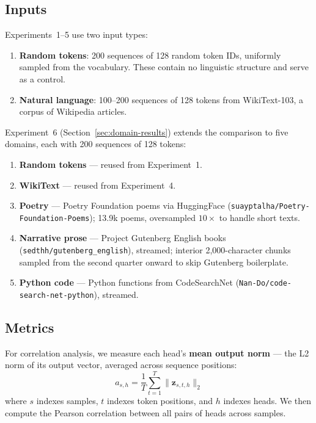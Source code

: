 \documentclass[11pt,a4paper]{article}
\begin{document}
\subsection{Inputs}

Experiments~1--5 use two input types:
\begin{enumerate}[itemsep=2pt]
    \item \textbf{Random tokens}: 200 sequences of 128 random token IDs, uniformly sampled from the vocabulary. These contain no linguistic structure and serve as a control.
    \item \textbf{Natural language}: 100--200 sequences of 128 tokens from WikiText-103, a corpus of Wikipedia articles.
\end{enumerate}

Experiment~6 (Section~\ref{sec:domain-results}) extends the comparison to five domains, each with 200 sequences of 128 tokens:

\begin{enumerate}[itemsep=2pt]
    \item \textbf{Random tokens} --- reused from Experiment~1.
    \item \textbf{WikiText} --- reused from Experiment~4.
    \item \textbf{Poetry} --- Poetry Foundation poems via HuggingFace (\texttt{suayptalha/Poetry-Foundation-Poems}); 13.9k poems, oversampled $10\times$ to handle short texts.
    \item \textbf{Narrative prose} --- Project Gutenberg English books (\texttt{sedthh/gutenberg\_english}), streamed; interior 2{,}000-character chunks sampled from the second quarter onward to skip Gutenberg boilerplate.
    \item \textbf{Python code} --- Python functions from CodeSearchNet (\texttt{Nan-Do/code-search-net-python}), streamed.
\end{enumerate}

\subsection{Metrics}

For correlation analysis, we measure each head's \textbf{mean output norm} --- the L2 norm of its output vector, averaged across sequence positions:
\[
    a_{s,h} = \frac{1}{T} \sum_{t=1}^{T} \| \mathbf{z}_{s,t,h} \|_2
\]
where $s$ indexes samples, $t$ indexes token positions, and $h$ indexes heads.
We then compute the Pearson correlation between all pairs of heads across samples.
\end{document}
